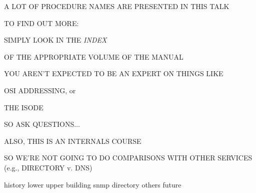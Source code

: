 \begin{bwslide}

\begin{nrtc}
\item	A LOT OF PROCEDURE NAMES ARE PRESENTED IN THIS TALK

\item	TO FIND OUT MORE:
    \begin{nrtc}
    \item	SIMPLY LOOK IN THE \emph{INDEX}

    \item	OF THE APPROPRIATE VOLUME OF THE MANUAL
    \end{nrtc}
\end{nrtc}
\end{bwslide}


\begin{bwslide}

\begin{nrtc}
\item	YOU AREN'T EXPECTED TO BE AN EXPERT ON THINGS LIKE
    \begin{nrtc}
    \item	OSI ADDRESSING, or

    \item	THE ISODE
    \end{nrtc}
    SO ASK QUESTIONS$\ldots$

\item	ALSO, THIS IS AN INTERNALS COURSE
    \begin{nrtc}
    \item	SO WE'RE NOT GOING TO DO COMPARISONS WITH OTHER SERVICES
		(e.g., DIRECTORY v. DNS)
    \end{nrtc}
\end{nrtc}
\end{bwslide}


	{history}
	{lower}
	{upper}
	{building}
	{snmp}
	{directory}
	{others}
	{future}


